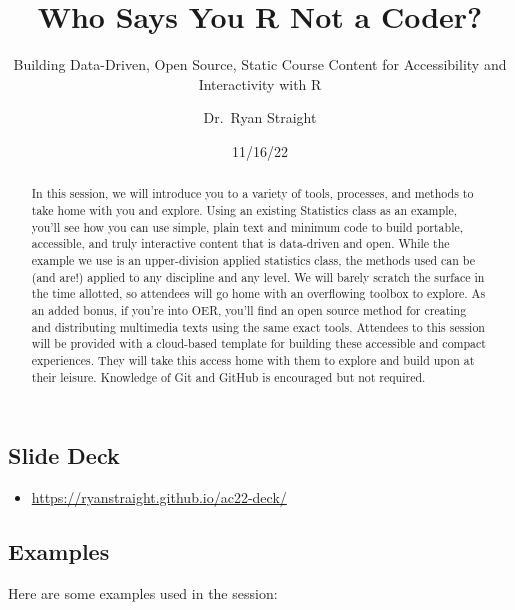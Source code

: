 \documentclass[
  letterpaper,
  DIV=11,
  numbers=noendperiod]{scrartcl}
\title{Who Says You R Not a Coder?}
\subtitle{Building Data-Driven, Open Source, Static Course Content for
Accessibility and Interactivity with R}
\author{Dr.~Ryan Straight}
\date{11/16/22}
\providecommand{\tightlist}{%
  \setlength{\itemsep}{0pt}\setlength{\parskip}{0pt}}\usepackage{longtable,booktabs,array}
\begin{document}
\maketitle
\begin{abstract}
In this session, we will introduce you to a variety of tools, processes,
and methods to take home with you and explore. Using an existing
Statistics class as an example, you'll see how you can use simple, plain
text and minimum code to build portable, accessible, and truly
interactive content that is data-driven and open. While the example we
use is an upper-division applied statistics class, the methods used can
be (and are!) applied to any discipline and any level. We will barely
scratch the surface in the time allotted, so attendees will go home with
an overflowing toolbox to explore. As an added bonus, if you're into
OER, you'll find an open source method for creating and distributing
multimedia texts using the same exact tools. Attendees to this session
will be provided with a cloud-based template for building these
accessible and compact experiences. They will take this access home with
them to explore and build upon at their leisure. Knowledge of Git and
GitHub is encouraged but not required.
\end{abstract}
\ifdefined\Shaded\renewenvironment{Shaded}{\begin{tcolorbox}[enhanced, sharp corners, interior hidden, borderline west={3pt}{0pt}{shadecolor}, breakable, boxrule=0pt, frame hidden]}{\end{tcolorbox}}\fi

\hypertarget{slide-deck}{%
\subsection{Slide Deck}\label{slide-deck}}

\begin{itemize}
\tightlist
\item
  \url{https://ryanstraight.github.io/ac22-deck/}
\end{itemize}

\hypertarget{examples}{%
\subsection{Examples}\label{examples}}

Here are some examples used in the session:
\end{document}
